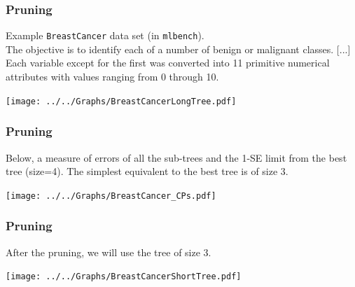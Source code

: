 \begin{frame}
\frametitle{Pruning}
Example {\tt BreastCancer} data set (in {\tt mlbench}).\\
\scriptsize
The objective is to identify each of a number of benign or malignant classes. [...] Each variable except for the first was converted into 11 primitive numerical attributes with values ranging from 0 through 10. 
\normalsize
\begin{center}
\texttt{[image: ../../Graphs/BreastCancerLongTree.pdf]}
\end{center}
\end{frame}
\begin{frame}
\frametitle{Pruning}
Below, a measure of errors of all the sub-trees and the 1-SE limit from the best tree (size=4). The simplest equivalent to the best tree is of size 3.
\begin{center}
\texttt{[image: ../../Graphs/BreastCancer\_CPs.pdf]}
\end{center}
\end{frame}
\begin{frame}
\frametitle{Pruning}
After the pruning, we will use the tree of size 3.
\begin{center}
\texttt{[image: ../../Graphs/BreastCancerShortTree.pdf]}
\end{center}
\end{frame}

